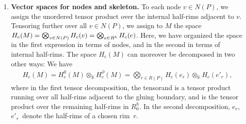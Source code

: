 \documentclass[pdftex]{sigma}
\DeclareMathOperator{\Hom}{Hom}
\DeclareMathOperator{\K}{\mathbb{K}}
\DeclareMathOperator{\calc}{\mathcal{C}}
\numberwithin{equation}{section}
\theoremstyle{definition}
\begin{document}
\begin{enumerate}
 If $r$ is a rim coming from a defect edge, the procedure that assigns a vector space is very similar. Note however that here, we have an additional object $Y \in \calc$ labeling $r$. The rim $r$ has only two neighboring branches, a left and a right one, and both orientations are compatible. For concreteness, we assume that the orientation of the left one induces the orientation of the half-rim $e$ (which is possibly different from the orientation of the defect edge in $\Gamma$). Then, we set $H_c(e) = \Hom_{\calc}\left(\mathbbm{1}, x_{\ell} \otimes Y^{\varepsilon} \otimes x_r^*\right)$, where $x_{\ell}$ decorates the left branch, $x_r$ the right one and the sign $\varepsilon$ is positive precisely if the orientation of the edge in $E(\Gamma)$ defining $r$ agrees with the one of the half-edge $e$.
 \item \label{itemSpaces} \textbf{Vector spaces for nodes and skeleton.} To each node $v \in N(P)$, we assign the unordered tensor product  over the internal half-rims adjacent to $v$. Tensoring further over all $v \in N(P)$, we assign to $M$ the space $H_c(M) = \smash{\bigotimes_{v \in N(P)}H_c(v)} = \smash{\bigotimes_{e \in R^h}H_c(e)}$. Here, we have organized the space in the first expression in terms of nodes, and in the second in terms of internal half-rims. The space $H_c(M)$ can moreover be decomposed in two other ways: We have
 \begin{align}
 \label{eqDec}
 H_c(M) = H_c^0(M) \otimes_{\K} H_c^{\partial}(M) = \bigotimes_{r \in R(P)} H_c(e_r) \otimes_{\K} H_c(e'_r),
 \end{align}
 where in the first tensor decomposition, the tensorand  is a tensor product running over all half-rims adjacent to the gluing boundary, and  is the tensor product over the remaining half-rims in $R_0^h$. In the second decomposition, $e_r$,~$e'_r$~denote the half-rims of a chosen rim~$r$.


\end{enumerate}
\end{document}
